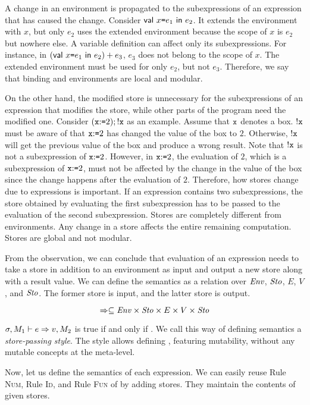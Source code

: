 A change in an environment is propagated to the subexpressions of an expression
that has caused the change. Consider $\textsf{val}\ x\texttt{=} e_1\ \textsf{in}\ e_2$.
It extends the environment with $x$, but only $e_2$ uses the
extended environment because the scope of $x$ is $e_2$ but nowhere else.
A variable definition can affect only its subexpressions.
For instance, in $(\textsf{val}\ x\texttt{=} e_1\ \textsf{in}\ e_2)+e_3$, $e_3$ does not belong to
the scope of $x$. The extended environment must be used for only $e_2$, but not
$e_3$. Therefore, we say that binding and environments are local and modular.

On the other hand, the modified store is unnecessary for the subexpressions of an
expression that modifies the store, while other parts of the program need
the modified one. Consider $(\texttt{x}{:}\texttt{=}2);!\texttt{x}$ as an example.
Assume that $\texttt{x}$ denotes a box.
$!\texttt{x}$ must be aware of that $\texttt{x}{:}\texttt{=}2$ has changed the value of the box
to $2$. Otherwise, $!\texttt{x}$ will get the previous value of the box and
produce a wrong result. Note that $!\texttt{x}$ is not a subexpression of
$\texttt{x}{:}\texttt{=}2$. However, in $\texttt{x}{:}\texttt{=}2$, the evaluation of $2$, which is a
subexpression of $\texttt{x}{:}\texttt{=}2$, must not be affected by the change in the value
of the box since the change happens after the evaluation of $2$. Therefore,
how stores change due to expressions is important. If an expression contains two
subexpressions, the store obtained by evaluating the first subexpression has to be
passed to the evaluation of the second subexpression. Stores are completely
different from environments. Any change in a store affects the entire remaining
computation. Stores are global and not modular.

From the observation, we can conclude that evaluation of an expression needs to
take a store in addition to an environment as input and output a new store along
with a result value. We can define the semantics as a
relation over $\mbox{\emph{Env}}$, $\mbox{\emph{Sto}}$, $E$, $V$, and $\mbox{\emph{Sto}}$.
The former store is input, and the latter store is output.

\[\Rightarrow\subseteq\mbox{\emph{Env}}\times\mbox{\emph{Sto}}\times E\times V\times\mbox{\emph{Sto}}\]

$\sigma,M_{1}\vdash e\Rightarrow v,M_{2}$ is true if and only if .
We call this way of defining semantics a \textit{store-passing
style}. The style allows defining \Lang, featuring
mutability, without any mutable concepts at the meta-level.

Now, let us define the semantics of each expression. We can easily reuse Rule
\textsc{Num}, Rule \textsc{Id}, and Rule \textsc{Fun} of \Lang by adding stores.
They maintain the contents of given stores.


